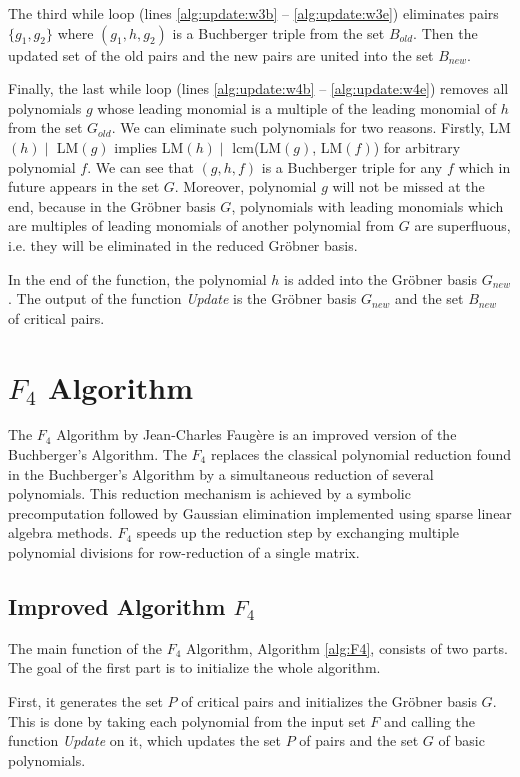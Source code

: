 The third while loop (lines \ref{alg:update:w3b} -- \ref{alg:update:w3e}) eliminates pairs $\{g_1, g_2\}$ where $(g_1, h, g_2)$ is a Buchberger triple from the set $B_{old}$. Then the updated set of the old pairs and the new pairs are united into the set $B_{new}$.

Finally, the last while loop (lines \ref{alg:update:w4b} -- \ref{alg:update:w4e}) removes all polynomials $g$ whose leading monomial is a multiple of the leading monomial of $h$ from the set $G_{old}$. We can eliminate such polynomials for two reasons. Firstly, LM$(h) \mid$ LM$(g)$ implies LM$(h) \mid$ lcm(LM$(g)$, LM$(f)$) for arbitrary polynomial $f$. We can see that $(g, h, f)$ is a Buchberger triple for any $f$ which in future appears in the set $G$. Moreover, polynomial $g$ will not be missed at the end, because in the Gr\"obner basis $G$, polynomials with leading monomials which are multiples of leading monomials of another polynomial from $G$ are superfluous, i.e. they will be eliminated in the reduced Gr\"obner basis.

In the end of the function, the polynomial $h$ is added into the Gr\"obner basis $G_{new}$. The output of the function \textit{Update} is the Gr\"obner basis $G_{new}$ and the set $B_{new}$ of critical pairs.



\section{$F_4$ Algorithm}
The $F_4$ Algorithm \cite{F4} by Jean-Charles Faug\`ere is an improved version of the Buchberger's Algorithm. The $F_4$ replaces the classical polynomial reduction found in the Buchberger's Algorithm by a simultaneous reduction of several polynomials. This reduction mechanism is achieved by a symbolic precomputation followed by Gaussian elimination implemented using sparse linear algebra methods. $F_4$ speeds up the reduction step by exchanging multiple polynomial divisions for row-reduction of a single matrix.

\subsection{Improved Algorithm $F_4$}
The main function of the $F_4$ Algorithm, Algorithm \ref{alg:F4}, consists of two parts. The goal of the first part is to initialize the whole algorithm.

First, it generates the set $P$ of critical pairs and initializes the Gr\"obner basis $G$. This is done by taking each polynomial from the input set $F$ and calling the function \textit{Update} on it, which updates the set $P$ of pairs and the set $G$ of basic polynomials.

